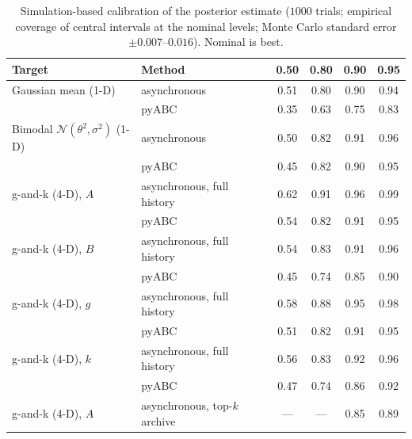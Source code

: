 \documentclass[10pt]{article}
\theoremstyle{plain}
\theoremstyle{definition}
\begin{document}
\begin{table}[t]
\caption{Simulation-based calibration of the posterior estimate ($1000$ trials; empirical coverage of central intervals at the nominal levels; Monte Carlo standard error ${\pm}0.007$--$0.016$). Nominal is best.}\label{tab:sbc}
\centering
\begin{tabular}{@{}llcccc@{}}
\toprule
Target & Method & 0.50 & 0.80 & 0.90 & 0.95 \\
\midrule
Gaussian mean (1-D)     & asynchronous & 0.51 & 0.80 & 0.90 & 0.94 \\
                        & pyABC & 0.35 & 0.63 & 0.75 & 0.83 \\
Bimodal $\mathcal N(\theta^2,\sigma^2)$ (1-D) & asynchronous & 0.50 & 0.82 & 0.91 & 0.96 \\
                        & pyABC & 0.45 & 0.82 & 0.90 & 0.95 \\
g-and-k (4-D), $A$      & asynchronous, full history & 0.62 & 0.91 & 0.96 & 0.99 \\
                        & pyABC & 0.54 & 0.82 & 0.91 & 0.95 \\
g-and-k (4-D), $B$      & asynchronous, full history & 0.54 & 0.83 & 0.91 & 0.96 \\
                        & pyABC & 0.45 & 0.74 & 0.85 & 0.90 \\
g-and-k (4-D), $g$      & asynchronous, full history & 0.58 & 0.88 & 0.95 & 0.98 \\
                        & pyABC & 0.51 & 0.82 & 0.91 & 0.95 \\
g-and-k (4-D), $k$      & asynchronous, full history & 0.56 & 0.83 & 0.92 & 0.96 \\
                        & pyABC & 0.47 & 0.74 & 0.86 & 0.92 \\
g-and-k (4-D), $A$      & asynchronous, top-$k$ archive & --- & --- & 0.85 & 0.89 \\
\bottomrule
\end{tabular}
\end{table}
\end{document}
